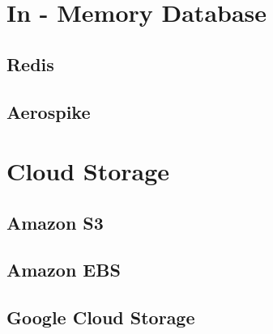 \section{In - Memory Database}

\subsection{Redis}
\subsection{Aerospike}

\section{Cloud Storage}

\subsection{Amazon S3}
\subsection{Amazon EBS}
\subsection{Google Cloud Storage}